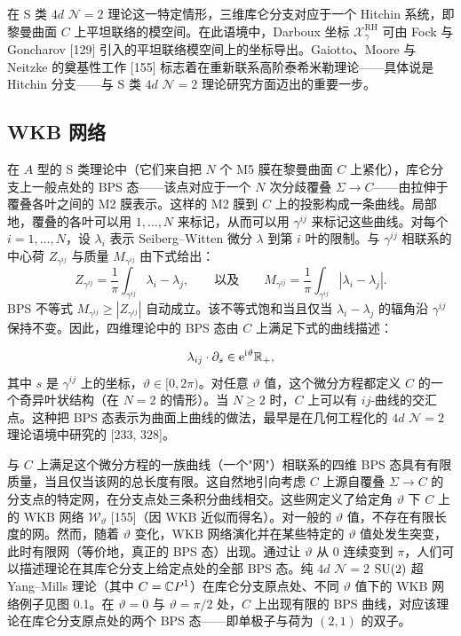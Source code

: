 在 S 类 $4d$ $\mathcal{N}=2$ 理论这一特定情形，三维库仑分支对应于一个 Hitchin 系统，即黎曼曲面 $C$ 上平坦联络的模空间。在此语境中，Darboux 坐标 $\mathcal{X}^{\mathrm{RH}}_\gamma$ 可由 Fock 与 Goncharov [129] 引入的平坦联络模空间上的坐标导出。Gaiotto、Moore 与 Neitzke 的奠基性工作 [155] 标志着在重新联系高阶泰希米勒理论——具体说是 Hitchin 分支——与 S 类 $4d$ $\mathcal{N}=2$ 理论研究方面迈出的重要一步。

\subsection*{WKB 网络}

在 $A$ 型的 S 类理论中（它们来自把 $N$ 个 M5 膜在黎曼曲面 $C$ 上紧化），库仑分支上一般点处的 BPS 态——该点对应于一个 $N$ 次分歧覆叠 $\Sigma\to C$——由拉伸于覆叠各叶之间的 M2 膜表示。这样的 M2 膜到 $C$ 上的投影构成一条曲线。局部地，覆叠的各叶可以用 $1,\dots,N$ 来标记，从而可以用 $\gamma^{ij}$ 来标记这些曲线。对每个 $i=1,\dots,N$，设 $\lambda_i$ 表示 Seiberg--Witten 微分 $\lambda$ 到第 $i$ 叶的限制。与 $\gamma^{ij}$ 相联系的中心荷 $Z_{\gamma^{ij}}$ 与质量 $M_{\gamma^{ij}}$ 由下式给出：
\[
Z_{\gamma^{ij}}=\frac{1}{\pi}\int_{\gamma^{ij}}\lambda_i-\lambda_j,
\qquad\text{以及}\qquad
M_{\gamma^{ij}}=\frac{1}{\pi}\int_{\gamma^{ij}}|\lambda_i-\lambda_j|.
\]
BPS 不等式 $M_{\gamma^{ij}}\ge|Z_{\gamma^{ij}}|$ 自动成立。该不等式饱和当且仅当 $\lambda_i-\lambda_j$ 的辐角沿 $\gamma^{ij}$ 保持不变。因此，四维理论中的 BPS 态由 $C$ 上满足下式的曲线描述：


\[
\lambda_{ij}\cdot\partial_s\in \mathrm{e}^{\mathrm{i}\vartheta}\mathbb{R}_+,
\]
其中 $s$ 是 $\gamma^{ij}$ 上的坐标，$\vartheta\in[0,2\pi)$。对任意 $\vartheta$ 值，这个微分方程都定义 $C$ 的一个奇异叶状结构（在 $N=2$ 的情形）。当 $N\ge 2$ 时，$C$ 上可以有 $ij$-曲线的交汇点。这种把 BPS 态表示为曲面上曲线的做法，最早是在几何工程化的 $4d$ $\mathcal{N}=2$ 理论语境中研究的 [233, 328]。

与 $C$ 上满足这个微分方程的一族曲线（一个"网"）相联系的四维 BPS 态具有有限质量，当且仅当该网的总长度有限。这自然地引向考虑 $C$ 上源自覆叠 $\Sigma\to C$ 的分支点的特定网，在分支点处三条积分曲线相交。这些网定义了给定角 $\vartheta$ 下 $C$ 上的 WKB 网络 $\mathcal{W}_\vartheta$ [155]（因 WKB 近似而得名）。对一般的 $\vartheta$ 值，不存在有限长度的网。然而，随着 $\vartheta$ 变化，WKB 网络演化并在某些特定的 $\vartheta$ 值处发生突变，此时有限网（等价地，真正的 BPS 态）出现。通过让 $\vartheta$ 从 $0$ 连续变到 $\pi$，人们可以描述理论在其库仑分支上给定点处的全部 BPS 态。纯 $4d$ $\mathcal{N}=2$ $\operatorname{SU}(2)$ 超 Yang--Mills 理论（其中 $C=\mathbb{C} P^1$）在库仑分支原点处、不同 $\vartheta$ 值下的 WKB 网络例子见图 0.1。在 $\vartheta=0$ 与 $\vartheta=\pi/2$ 处，$C$ 上出现有限的 BPS 曲线，对应该理论在库仑分支原点处的两个 BPS 态——即单极子与荷为 $(2,1)$ 的双子。


